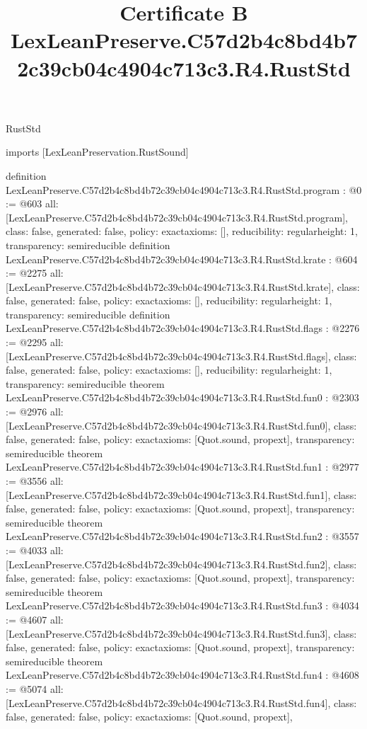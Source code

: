 \begin{lexlean}{RustStd}
\title{Certificate B LexLeanPreserve.C57d2b4c8bd4b72c39cb04c4904c713c3.R4.RustStd}
\begin{coremodule}
imports [LexLeanPreservation.RustSound]

definition LexLeanPreserve.C57d2b4c8bd4b72c39cb04c4904c713c3.R4.RustStd.program : @0 := @603 {
  all: [LexLeanPreserve.C57d2b4c8bd4b72c39cb04c4904c713c3.R4.RustStd.program],
  class: false,
  generated: false,
  policy: exact{axioms: []},
  reducibility: regular{height: 1},
  transparency: semireducible
}
definition LexLeanPreserve.C57d2b4c8bd4b72c39cb04c4904c713c3.R4.RustStd.krate : @604 := @2275 {
  all: [LexLeanPreserve.C57d2b4c8bd4b72c39cb04c4904c713c3.R4.RustStd.krate],
  class: false,
  generated: false,
  policy: exact{axioms: []},
  reducibility: regular{height: 1},
  transparency: semireducible
}
definition LexLeanPreserve.C57d2b4c8bd4b72c39cb04c4904c713c3.R4.RustStd.flags : @2276 := @2295 {
  all: [LexLeanPreserve.C57d2b4c8bd4b72c39cb04c4904c713c3.R4.RustStd.flags],
  class: false,
  generated: false,
  policy: exact{axioms: []},
  reducibility: regular{height: 1},
  transparency: semireducible
}
theorem LexLeanPreserve.C57d2b4c8bd4b72c39cb04c4904c713c3.R4.RustStd.fun0 : @2303 := @2976 {
  all: [LexLeanPreserve.C57d2b4c8bd4b72c39cb04c4904c713c3.R4.RustStd.fun0],
  class: false,
  generated: false,
  policy: exact{axioms: [Quot.sound, propext]},
  transparency: semireducible
}
theorem LexLeanPreserve.C57d2b4c8bd4b72c39cb04c4904c713c3.R4.RustStd.fun1 : @2977 := @3556 {
  all: [LexLeanPreserve.C57d2b4c8bd4b72c39cb04c4904c713c3.R4.RustStd.fun1],
  class: false,
  generated: false,
  policy: exact{axioms: [Quot.sound, propext]},
  transparency: semireducible
}
theorem LexLeanPreserve.C57d2b4c8bd4b72c39cb04c4904c713c3.R4.RustStd.fun2 : @3557 := @4033 {
  all: [LexLeanPreserve.C57d2b4c8bd4b72c39cb04c4904c713c3.R4.RustStd.fun2],
  class: false,
  generated: false,
  policy: exact{axioms: [Quot.sound, propext]},
  transparency: semireducible
}
theorem LexLeanPreserve.C57d2b4c8bd4b72c39cb04c4904c713c3.R4.RustStd.fun3 : @4034 := @4607 {
  all: [LexLeanPreserve.C57d2b4c8bd4b72c39cb04c4904c713c3.R4.RustStd.fun3],
  class: false,
  generated: false,
  policy: exact{axioms: [Quot.sound, propext]},
  transparency: semireducible
}
theorem LexLeanPreserve.C57d2b4c8bd4b72c39cb04c4904c713c3.R4.RustStd.fun4 : @4608 := @5074 {
  all: [LexLeanPreserve.C57d2b4c8bd4b72c39cb04c4904c713c3.R4.RustStd.fun4],
  class: false,
  generated: false,
  policy: exact{axioms: [Quot.sound, propext]},
}
\end{coremodule}
\end{lexlean}
